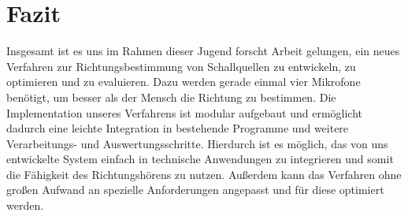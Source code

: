 \section{Fazit}
Insgesamt ist es uns im Rahmen dieser Jugend forscht Arbeit gelungen, ein neues Verfahren zur Richtungsbestimmung von Schallquellen zu entwickeln, zu optimieren und zu evaluieren. Dazu werden gerade einmal vier Mikrofone benötigt, um besser als der Mensch die Richtung zu bestimmen. Die Implementation unseres Verfahrens ist modular aufgebaut und ermöglicht dadurch eine leichte Integration in bestehende Programme und weitere Verarbeitungs- und Auswertungsschritte. Hierdurch ist es möglich, das von uns entwickelte System einfach in technische Anwendungen zu integrieren und somit die Fähigkeit des Richtungshörens zu nutzen. Außerdem kann das Verfahren ohne großen Aufwand an spezielle Anforderungen angepasst und für diese optimiert werden.